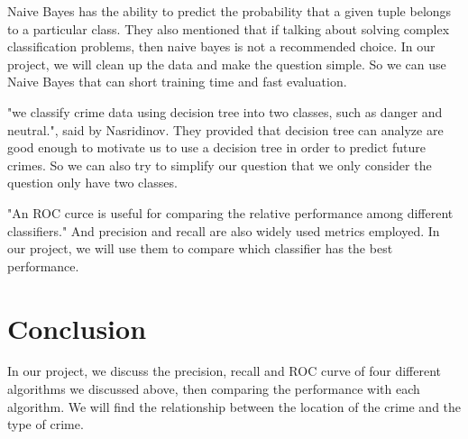 \documentclass{article}
\begin{document}
Naive Bayes has the ability to predict the probability that a given tuple belongs to a particular class.\cite{iqbal2013experimental} They also mentioned that if talking about solving complex classification problems, then naive bayes is not a recommended choice. In our project, we will clean up the data and make the question simple. So we can use Naive Bayes that can short training time and fast evaluation.

"we classify crime data using decision tree into two classes, such as danger and neutral.", said by Nasridinov. \cite{nasridinov2013decision} They provided that decision tree can analyze are good enough to motivate us to use a decision tree in order to predict future crimes. So we can also try to simplify our question that we only consider the question only have two classes.

"An ROC curce is useful for comparing the relative performance among different classifiers."\cite{Tan:2018:IDM:3208440} And precision and recall are also widely used metrics employed. In our project, we will use them to compare which classifier has the best performance.
\section{Conclusion}

In our project, we discuss the precision, recall and ROC curve of four different algorithms we discussed above, then comparing the performance with each algorithm. We will find the relationship between the location of the crime and the type of crime.




\end{document}
